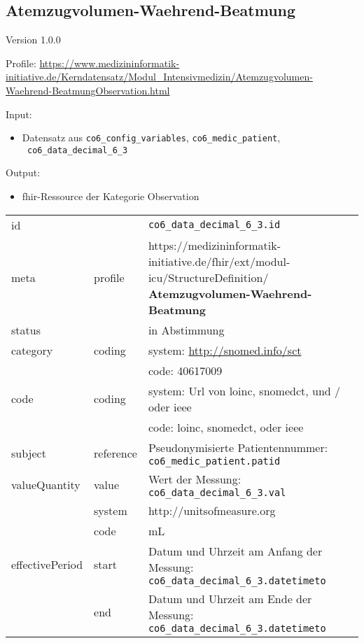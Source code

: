 \subsection{
Atemzugvolumen-Waehrend-Beatmung} 
\noindent Version 1.0.0

\noindent Profile: \url{https://www.medizininformatik-initiative.de/Kerndatensatz/Modul_Intensivmedizin/Atemzugvolumen-Waehrend-BeatmungObservation.html}

\noindent Input:
\begin{itemize}
	\item Datensatz aus \texttt{co6\_config\_variables}, \texttt{co6\_medic\_patient}, \\ \texttt{
co6\_data\_decimal\_6\_3}
\end{itemize}
Output:
\begin{itemize}
        \item \ac{fhir}-Ressource der Kategorie \glqq Observation\grqq{}
\end{itemize}
\begin{longtable}{|l|l|p{7.5cm}|}
        \hline
        \rowcolor{lightgray} \multicolumn{3}{|l|}{Data Mapping (inhaltlich)} \\ \hline
        id &  & \texttt{co6\_data\_decimal\_6\_3.id} \\ \hline
	meta & profile & https://medizininformatik-initiative.de/fhir/ext/modul-icu/StructureDefinition/\textbf{
Atemzugvolumen-Waehrend-Beatmung} \\ \hline 
	status &  & in Abstimmung  \\ \hline 
	category & coding & system: \url{http://snomed.info/sct} \\
\cline{3-3}
	& & code: 40617009 \\ \hline
	code & coding & system: Url von \ac{loinc}, \ac{snomedct}, und / oder \ac{ieee} \\ 
	\cline{3-3} 
	 &  & code: \ac{loinc}, \ac{snomedct}, oder \ac{ieee} \\ \hline
	subject & reference & Pseudonymisierte Patientennummer: \texttt{co6\_medic\_patient.patid} \\ \hline
	valueQuantity & value & Wert der Messung: \texttt{
co6\_data\_decimal\_6\_3.val} \\
        \cline{2-3}
         & system & http://unitsofmeasure.org \\
         \cline{2-3}
         & code & mL
\\ \hline
    effectivePeriod & start & Datum und Uhrzeit am Anfang der Messung: \texttt{
co6\_data\_decimal\_6\_3.datetimeto} \\
    \cline{2-3}
     & end & Datum und Uhrzeit am Ende der Messung: \texttt{
co6\_data\_decimal\_6\_3.datetimeto} \\ \hline
\end{longtable}


